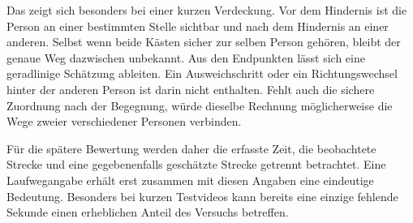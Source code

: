 Das zeigt sich besonders bei einer kurzen Verdeckung. Vor dem Hindernis ist die Person an einer bestimmten Stelle sichtbar und nach dem Hindernis an einer anderen. Selbst wenn beide Kästen sicher zur selben Person gehören, bleibt der genaue Weg dazwischen unbekannt. Aus den Endpunkten lässt sich eine geradlinige Schätzung ableiten. Ein Ausweichschritt oder ein Richtungswechsel hinter der anderen Person ist darin nicht enthalten. Fehlt auch die sichere Zuordnung nach der Begegnung, würde dieselbe Rechnung möglicherweise die Wege zweier verschiedener Personen verbinden.

Für die spätere Bewertung werden daher die erfasste Zeit, die beobachtete Strecke und eine gegebenenfalls geschätzte Strecke getrennt betrachtet. Eine Laufwegangabe erhält erst zusammen mit diesen Angaben eine eindeutige Bedeutung. Besonders bei kurzen Testvideos kann bereits eine einzige fehlende Sekunde einen erheblichen Anteil des Versuchs betreffen.
\clearpage
